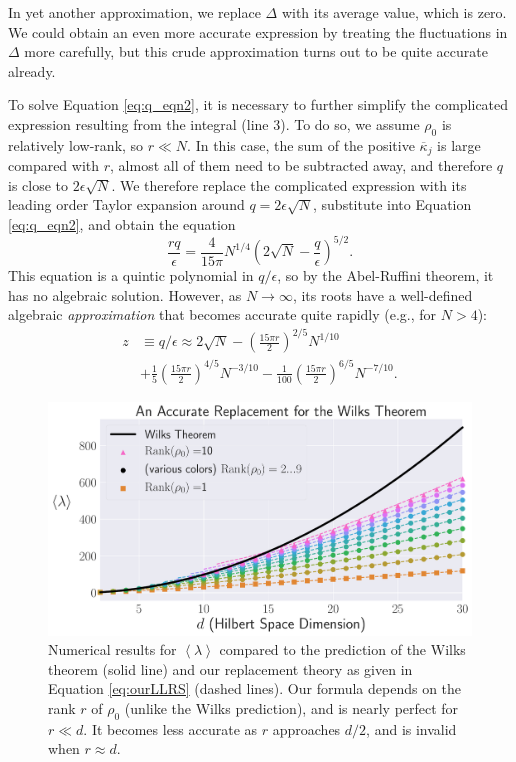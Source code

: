 \documentclass[aps,pra, twocolumn]{revtex4-1}
\newcommand{\expect}[1]{\ensuremath{\left\langle#1\right\rangle}}
\begin{document}
In yet another approximation, we replace $\Delta$ with its average value, which is zero.  We could obtain an even more accurate expression 
 by treating the fluctuations in $\Delta$ more carefully, but this crude approximation turns out to be quite accurate already.

To solve Equation \eqref{eq:q_eqn2}, it is necessary to further simplify the complicated expression resulting from the integral (line 3).  To do so, we 
assume  $\rho_0$ is relatively low-rank, so $r \ll N$.  In this case, the sum of the positive $\overline{\kappa}_j$ is large compared 
with $r$, almost all of them need to be subtracted away, and therefore $q$ is close to $2\epsilon\sqrt{N}$.  We therefore replace 
the complicated expression with its leading order Taylor expansion around $q=2\epsilon\sqrt{N}$, substitute into Equation \eqref{eq:q_eqn2}, and 
obtain the equation
\begin{equation}
\frac{rq}{\epsilon}  = \frac{4}{15\pi}N^{1/4}\left(2\sqrt{N}-\frac{q}{\epsilon}\right)^{5/2}.
\end{equation}
This equation is a quintic polynomial in $q/\epsilon$, so by the Abel-Ruffini theorem, it has no algebraic solution.  However, as $N \rightarrow \infty$, its roots have a well-defined algebraic \emph{approximation} that becomes accurate quite rapidly (e.g., for $N>4$):
\begin{align}
\label{eq:truncation}
\nonumber z &\equiv q/\epsilon \approx 2\sqrt{N} - \left(\frac{15\pi r}{2}\right)^{2/5}N^{1/10}\\
&+ \frac{1}{5}\left(\frac{15\pi r}{2}\right)^{4/5}N^{-3/10} - \frac{1}{100}\left(\frac{15\pi r}{2}\right)^{6/5}N^{-7/10} .
\end{align}

\begin{figure}
 \includegraphics[width=\columnwidth]{Images/Figure_9.pdf}
 \caption{Numerical results for $\expect{\lambda}$ compared to the prediction of the Wilks theorem (solid line) and our replacement theory as given in Equation \eqref{eq:ourLLRS} (dashed lines).  Our formula depends on the rank $r$ of $\rho_0$ (unlike the Wilks prediction), and is nearly perfect for $r\ll d$.  It becomes less accurate as $r$ approaches $d/2$, and is invalid when $r\approx d$.}
 \label{fig:modelcomp-iso}
\end{figure}
\end{document}
